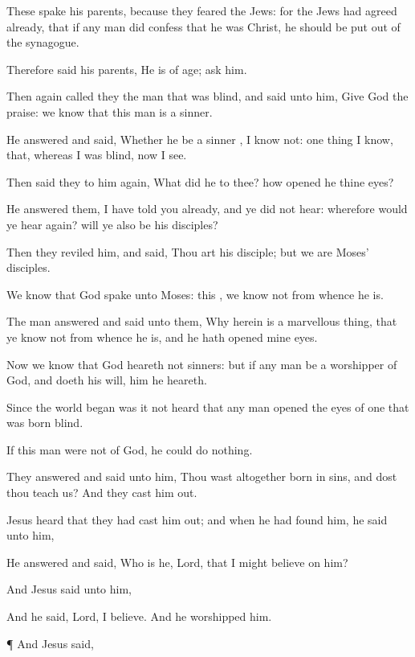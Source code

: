 {These
{}
spake
his
parents,
because they
feared the
Jews:
for the
Jews had
agreed
already,
that
if any
man did
confess that he
was
Christ, he should be
put out of the
synagogue.

Therefore
said
his
parents, He
is of
age;
ask
him.

Then
again called
they the
man
that
was
blind,
and
said unto
him,
Give
God the
praise:
we
know
that
this
man
is a
sinner.

He
answered
and
said,
Whether he
be a
sinner
{}, I
know
not: one
thing I
know,
that, whereas I
was
blind,
now I
see.

Then said
they to
him
again,
What did
he to
thee?
how opened
he
thine
eyes?

He
answered
them, I have
told
you
already,
and ye
did
not
hear:
wherefore would
ye
hear
{}
again?
will
ye
also
be
his
disciples?

Then they
reviled
him,
and
said,
Thou
art
his
disciple;
but
we
are
Moses’
disciples.

We
know
that
God
spake unto
Moses:
{}
this
{}, we
know
not from
whence he
is.

The
man
answered
and
said unto
them,
Why
herein
is a marvellous
thing,
that
ye
know
not from
whence he
is,
and
{} he hath
opened
mine
eyes.

Now we
know
that
God
heareth
not
sinners:
but
if any
man
be a worshipper of
God,
and
doeth
his
will,
him he
heareth.

Since the world
began was
it
not
heard
that any
man
opened the
eyes of one that was
born
blind.

If this
man
were
not
of
God, he
could
do
nothing.

They
answered
and
said unto
him,
Thou
wast
altogether
born
in
sins,
and
dost
thou
teach
us?
And they
cast
him
out.

Jesus
heard
that they had
cast
him
out;
and when he had
found
him, he
said unto
him,
{}

He
answered
and
said,
Who is
he,
Lord,
that I might
believe
on
him?

And
Jesus
said unto
him,
{}

And
he
said,
Lord, I
believe.
And he
worshipped
him.


\par }{\PP {}¶
And
Jesus
said,
{}

}
